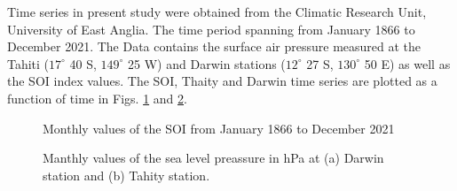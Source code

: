 \documentclass[onecolumn, preprint,aps,amsmath, amssymb, superscriptaddress]{revtex4}
\begin{document}
Time series in present study were obtained from the Climatic Research Unit, University of East Anglia. The time period spanning from January 1866 to December 2021. The Data contains the surface air pressure measured at the Tahiti ($17^{\circ}$ 40 S, $149^{\circ}$ 25 W) and Darwin stations  ($12^{\circ}$ 27 S, $130^{\circ}$ 50 E) as well as the SOI index values.
The SOI, Thaity and Darwin time series are plotted as a function of time in Figs. \ref{fig:SOI} and \ref{fig:stations}. 

\begin{figure}
\caption{Monthly values of the SOI from January 1866 to December 2021}
\label{fig:SOI}
\end{figure}

\begin{figure}
\caption{Manthly values of the sea level preassure in hPa at (a) Darwin station and (b) Tahity station.}
\label{fig:stations}
\end{figure}
\end{document}
